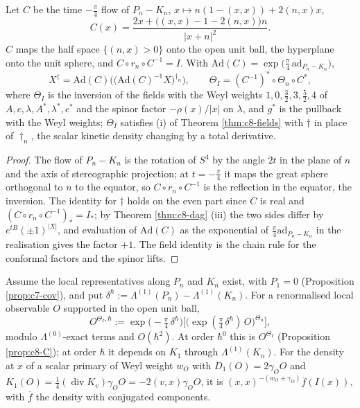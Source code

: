 \begin{proposition}
\label{prop:c8-C}
Let $C$ be the time $-\tfrac\pi4$ flow of $P_n-K_n$, $x\mapsto n(1-(x,x))+2(n,x)x$,
\[
C(x)=\frac{2x+\big((x,x)-1-2(n,x)\big)n}{|x+n|^2}.
\]
$C$ maps the half space $\{(n,x)>0\}$ onto the open unit ball, the hyperplane onto the unit sphere, and $C\circ r_n\circ C^{-1}=I$. With $\mathrm{Ad}(C)=\exp\big(\tfrac\pi4\,\mathrm{ad}_{P_n-K_n}\big)$,
\[
X^\dagger=\mathrm{Ad}(C)\Big(\big(\mathrm{Ad}(C)^{-1}X\big)^{\dagger_n}\Big),\qquad \Theta_I=(C^{-1})^*\circ\Theta_n\circ C^*,
\]
where $\Theta_I$ is the inversion of the fields with the Weyl weights $1,0,\tfrac32,3,\tfrac52,4$ of $A,c,\lambda,A^*,\lambda^*,c^*$ and the spinor factor $-\rho(x)/|x|$ on $\lambda$, and $g^*$ is the pullback with the Weyl weights; $\Theta_I$ satisfies (i) of Theorem \ref{thm:c8-fields} with $\dagger$ in place of $\dagger_n$, the scalar kinetic density changing by a total derivative.
\end{proposition}

\begin{proof}
The flow of $P_n-K_n$ is the rotation of $S^4$ by the angle $2t$ in the plane of $n$ and the axis of stereographic projection; at $t=-\tfrac\pi4$ it maps the great sphere orthogonal to $n$ to the equator, so $C\circ r_n\circ C^{-1}$ is the reflection in the equator, the inversion. The identity for $\dagger$ holds on the even part since $C$ is real and $(C\circ r_n\circ C^{-1})_*=I_*$; by Theorem \ref{thm:c8-dag} (iii) the two sides differ by $e^{tB}(\pm1)^{|X|}$, and evaluation of $\mathrm{Ad}(C)$ as the exponential of $\tfrac\pi4\mathrm{ad}_{P_n-K_n}$ in the realisation gives the factor $+1$. The field identity is the chain rule for the conformal factors and the spinor lifts.
\end{proof}

\begin{definition}
\label{def:c8-radial}
Assume the local representatives along $P_n$ and $K_n$ exist, with $P_1=0$ (Proposition \ref{prop:c7-cov}), and put $\delta^\hbar:=\Lambda^{(1)}(P_n)-\Lambda^{(1)}(K_n)$. For a renormalised local observable $O$ supported in the open unit ball,
\[
O^{\Theta_I,\hbar}:=\exp\big(-\tfrac\pi4\,\delta^\hbar\big)\Big[\big(\exp(\tfrac\pi4\,\delta^\hbar)\,O\big)^{\Theta_n}\Big],
\]
modulo $\Lambda^{(0)}$-exact terms and $O(\hbar^2)$. At order $\hbar^0$ this is $O^{\Theta_I}$ (Proposition \ref{prop:c8-C}); at order $\hbar$ it depends on $K_1$ through $\Lambda^{(1)}(K_n)$. For the density at $x$ of a scalar primary of Weyl weight $w_O$ with $D_1(O)=2\gamma_OO$ and $K_1(O)=\tfrac14(\operatorname{div}K_v)\gamma_OO=-2(v,x)\gamma_OO$, it is $(x,x)^{-(w_O+\gamma_O)}\overline f(I(x))$, with $\overline f$ the density with conjugated components.
\end{definition}

